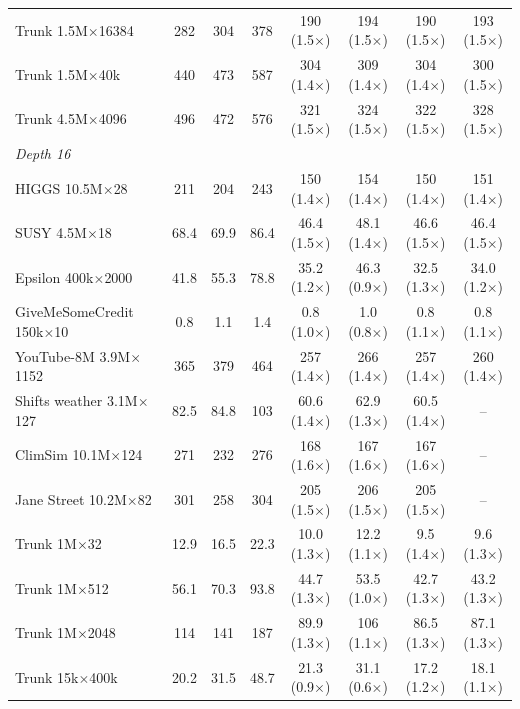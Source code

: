 \begin{table}[p]
\begin{tabular}{l|ccc|cccc}
        Trunk 1.5M$\times$16384 & 282 & 304 & 378 & 190 (1.5$\times$) & 194 (1.5$\times$) & 190 (1.5$\times$) & 193 (1.5$\times$) \\
        Trunk 1.5M$\times$40k & 440 & 473 & 587 & 304 (1.4$\times$) & 309 (1.4$\times$) & 304 (1.4$\times$) & 300 (1.5$\times$) \\
        Trunk 4.5M$\times$4096 & 496 & 472 & 576 & 321 (1.5$\times$) & 324 (1.5$\times$) & 322 (1.5$\times$) & 328 (1.5$\times$) \\
        \hline
        \multicolumn{8}{l}{\textit{Depth 16}} \\
        HIGGS 10.5M$\times$28 & 211 & 204 & 243 & 150 (1.4$\times$) & 154 (1.4$\times$) & 150 (1.4$\times$) & 151 (1.4$\times$) \\
        SUSY 4.5M$\times$18 & 68.4 & 69.9 & 86.4 & 46.4 (1.5$\times$) & 48.1 (1.4$\times$) & 46.6 (1.5$\times$) & 46.4 (1.5$\times$) \\
        Epsilon 400k$\times$2000 & 41.8 & 55.3 & 78.8 & 35.2 (1.2$\times$) & 46.3 (0.9$\times$) & 32.5 (1.3$\times$) & 34.0 (1.2$\times$) \\
        GiveMeSomeCredit 150k$\times$10 & 0.8 & 1.1 & 1.4 & 0.8 (1.0$\times$) & 1.0 (0.8$\times$) & 0.8 (1.1$\times$) & 0.8 (1.1$\times$) \\
        YouTube-8M 3.9M$\times$1152 & 365 & 379 & 464 & 257 (1.4$\times$) & 266 (1.4$\times$) & 257 (1.4$\times$) & 260 (1.4$\times$) \\
        Shifts weather 3.1M$\times$127 & 82.5 & 84.8 & 103 & 60.6 (1.4$\times$) & 62.9 (1.3$\times$) & 60.5 (1.4$\times$) & -- \\
        ClimSim 10.1M$\times$124 & 271 & 232 & 276 & 168 (1.6$\times$) & 167 (1.6$\times$) & 167 (1.6$\times$) & -- \\
        Jane Street 10.2M$\times$82 & 301 & 258 & 304 & 205 (1.5$\times$) & 206 (1.5$\times$) & 205 (1.5$\times$) & -- \\
        Trunk 1M$\times$32 & 12.9 & 16.5 & 22.3 & 10.0 (1.3$\times$) & 12.2 (1.1$\times$) & 9.5 (1.4$\times$) & 9.6 (1.3$\times$) \\
        Trunk 1M$\times$512 & 56.1 & 70.3 & 93.8 & 44.7 (1.3$\times$) & 53.5 (1.0$\times$) & 42.7 (1.3$\times$) & 43.2 (1.3$\times$) \\
        Trunk 1M$\times$2048 & 114 & 141 & 187 & 89.9 (1.3$\times$) & 106 (1.1$\times$) & 86.5 (1.3$\times$) & 87.1 (1.3$\times$) \\
        Trunk 15k$\times$400k & 20.2 & 31.5 & 48.7 & 21.3 (0.9$\times$) & 31.1 (0.6$\times$) & 17.2 (1.2$\times$) & 18.1 (1.1$\times$) \\

\end{tabular}
\end{table}
